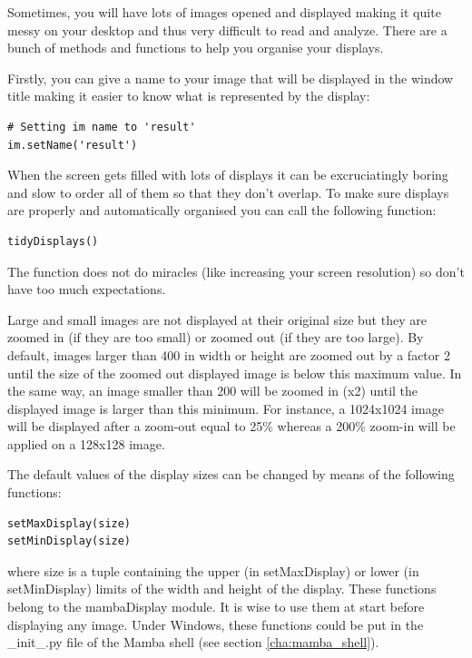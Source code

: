 \documentclass[a4paper,10pt,oneside]{article}
\begin{document}
Sometimes, you will have lots of images opened and displayed making it quite
messy on your desktop and thus very difficult to read and analyze. There are a
bunch of methods and functions to help you organise your displays.

Firstly, you can give a name to your image that will be displayed in the window
title making it easier to know what is represented by the display:

\lstset{language=Python}
\begin{lstlisting}
# Setting im name to 'result'
im.setName('result')
\end{lstlisting}

When the screen gets filled with lots of displays it can be excruciatingly
boring and slow to order all of them so that they don't overlap. To make sure 
displays are properly and automatically organised you can call the following 
function:

\lstset{language=Python}
\begin{lstlisting}
tidyDisplays()
\end{lstlisting}

The function does not do miracles (like increasing your screen resolution) so
don't have too much expectations.

Large and small images are not displayed at their original size but they are
zoomed in (if they are too small) or zoomed out (if they are too large). By
default, images larger than 400 in width or height are zoomed out by a factor 2
until the size of the zoomed out displayed image is below this maximum value.
In the same way, an image smaller than 200 will be zoomed in (x2) until
the displayed image is larger than this minimum. For instance, a 1024x1024 image
will be displayed after a zoom-out equal to 25\% whereas a 200\% zoom-in will be
applied on a 128x128 image.

The default values of the display sizes can be changed by means of the following
functions:

\lstset{language=Python}
\begin{lstlisting}
setMaxDisplay(size)
setMinDisplay(size)
\end{lstlisting}

where size is a tuple containing the upper (in setMaxDisplay) or lower (in
setMinDisplay) limits of the width and height of the display.
These functions belong to the mambaDisplay module. It is wise to use them at
start before displaying any image. Under Windows, these functions could be put
in the \_init\_.py file of the Mamba shell (see section \ref{cha:mamba_shell}).
\end{document}
